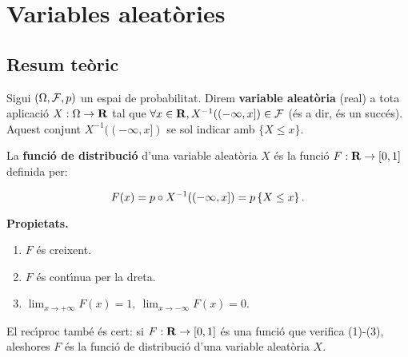 \chapter{Variables aleat\`ories} 

\section{Resum te\`oric}

\begin{defin}
Sigui $(\Omega, {\cal F}, p)$ un espai de probabilitat. Direm {\bf
variable aleat\`oria} (real) a tota
aplicaci\'o $X : \Omega \to {\bf R}$ tal que  $\forall x \in {\bf R}, X^{-1}((-\infty,x])
\in {\cal F}$ (\'es a dir, \'es un
succ\'es). Aquest
conjunt $X^{-1}((-\infty,x])$ se sol indicar amb $\{ X \leq x \}$.
\end{defin}

\begin{defin}
La {\bf funci\'o de distribuci\'o}
d'una variable aleat\`oria $X$ \'es la funci\'o $F: {\bf R} \to [0,1]$ definida per:

$$F(x) = p \circ X^{-1}((-\infty,x]) = p\left\{X \leq x\right\}.$$
\end{defin}

{\bf Propietats.}
\begin{enumerate}

\item $F$ \'es creixent.

\item $F$ \'es cont\'{\i}nua per la dreta.

\item $\displaystyle \lim_{x \to + \infty} F(x) = 1, \ \lim_{x \to - \infty}
F(x) = 0.$

\end{enumerate}

El rec\'{\i}proc tamb\'e \'es cert: si $F : {\bf R} \to [0,1]$ \'es una funci\'o que
verifica (1)-(3), aleshores $F$ \'es la funci\'o de distribuci\'o d'una variable
aleat\`oria $X$.

